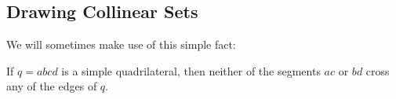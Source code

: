 \documentclass{patmorin}
\begin{document}
%
%

\subsection{Drawing Collinear Sets}


We will sometimes make use of this simple fact:
\begin{obs}
  If $q=abcd$ is a simple quadrilateral, then neither of the segments $ac$
  or $bd$ cross any of the edges of $q$.
\end{obs}
\end{document}
